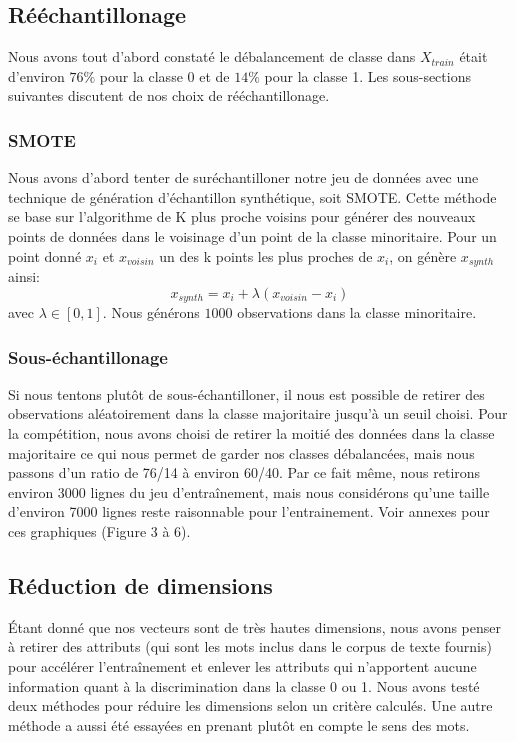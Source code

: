 \documentclass{article}
\begin{document}
\subsection{Rééchantillonage}
Nous avons tout d'abord constaté le débalancement de classe dans $X_{train}$ était d'environ $76\%$ pour la classe 0 et de $14\%$ pour la classe 1. Les sous-sections suivantes discutent de nos choix de rééchantillonage.
\subsubsection{SMOTE}
Nous avons d'abord tenter de suréchantilloner notre jeu de données avec une technique de génération d'échantillon synthétique, soit SMOTE. Cette méthode se base sur l'algorithme de K plus proche voisins pour générer des nouveaux points de données dans le voisinage d'un point de la classe minoritaire. Pour un point donné $x_i$ et $x_{voisin}$ un des k points les plus proches de $x_i$, on génère $x_{synth}$ ainsi:\\
$$x_{synth} = x_i + \lambda (x_{voisin} - x_i)$$ avec $\lambda \in [0, 1]$.
Nous générons $1000$ observations dans la classe minoritaire.
\subsubsection{Sous-échantillonage}
Si nous tentons plutôt de sous-échantilloner, il nous est possible de retirer des observations aléatoirement dans la classe majoritaire jusqu'à un seuil choisi. Pour la compétition, nous avons choisi de retirer la moitié des données dans la classe majoritaire ce qui nous permet de garder nos classes débalancées, mais nous passons d'un ratio de 76/14 à environ 60/40. Par ce fait même, nous retirons environ 3000 lignes du jeu d'entraînement, mais nous considérons qu'une taille d'environ 7000 lignes reste raisonnable pour l'entrainement. Voir annexes pour ces graphiques (Figure 3 à 6).
\subsection{Réduction de dimensions}
Étant donné que nos vecteurs sont de très hautes dimensions, nous avons penser à retirer des attributs (qui sont les mots inclus dans le corpus de texte fournis) pour accélérer l'entraînement et enlever les attributs qui n'apportent aucune information quant à la discrimination dans la classe 0 ou 1. Nous avons testé deux méthodes pour réduire les dimensions selon un critère calculés. Une autre méthode a aussi été essayées en prenant plutôt en compte le sens des mots.
\end{document}
